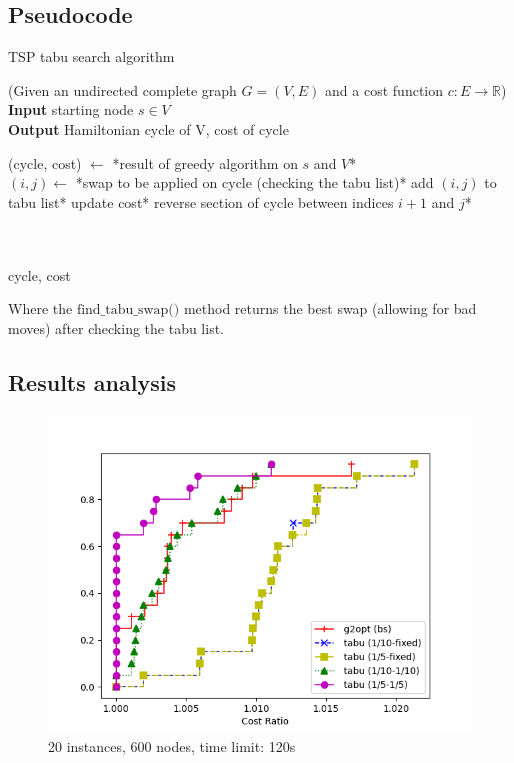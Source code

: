 \subsection{Pseudocode}

\begin{algorithm}
    \caption{TSP tabu search algorithm}
    (Given an undirected complete graph $G=(V,E)$ and a cost function $c:E\rightarrow\mathbb{R}$)\\
    
    \textbf{Input} starting node $s\in V$\\
    \textbf{Output} Hamiltonian cycle of V, cost of cycle\\
    \begin{algorithmic}
        
        \State (cycle, cost) $\gets$ *result of greedy algorithm on $s$ and $V$*\\

            \State $(i, j)\gets$ *swap to be applied on cycle (checking the tabu list)*
                \State *add $(i,j)$ to tabu list*
            \EndIf
            \State *update cost*
            \State *reverse section of cycle between indices $i+1$ and $j$*

        \EndWhile\\\\

        \Return cycle, cost
    \end{algorithmic}
\end{algorithm}

Where the $\mbox{find\_tabu\_swap()}$ method returns the best swap (allowing for bad moves) after checking the tabu list.

\subsection{Results analysis}

\begin{figure}[h]
    \centering
    \includegraphics*[width=.6\textwidth]{../plots/perfprof_tabu_costs.png}
    \caption*{20 instances, 600 nodes, time limit: 120s}
\end{figure}
\FloatBarrier

